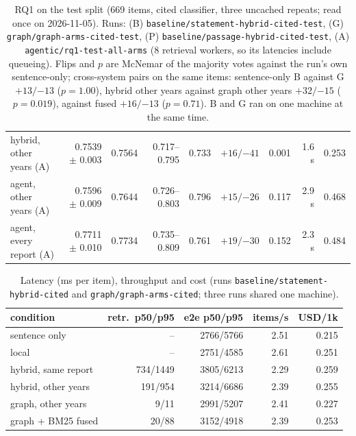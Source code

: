 \documentclass[11pt]{article}
\newcommand{\run}[1]{\nolinkurl{#1}}
\begin{document}
\begin{table}[!htbp]
\begin{tabular*}{\linewidth}{@{}@{\extracolsep{\fill}}lrrrrrrrr@{}}
hybrid, other years (A) & 0.7539 $\pm$ 0.003 & 0.7564 & 0.717--0.795 & 0.733 & $+16 / {-41}$ & 0.001 & 1.6 s & 0.253 \\
agent, other years (A) & 0.7596 $\pm$ 0.009 & 0.7644 & 0.726--0.803 & 0.796 & $+15 / {-26}$ & 0.117 & 2.9 s & 0.468 \\
agent, every report (A) & 0.7711 $\pm$ 0.010 & 0.7734 & 0.735--0.809 & 0.761 & $+19 / {-30}$ & 0.152 & 2.3 s & 0.484 \\
\bottomrule
\end{tabular*}
\caption{RQ1 on the test split (669 items, cited classifier, three uncached repeats; read once on 2026-11-05). Runs: (B) \run{baseline/statement-hybrid-cited-test}, (G) \run{graph/graph-arms-cited-test}, (P) \run{baseline/passage-hybrid-cited-test}, (A) \run{agentic/rq1-test-all-arms} (8 retrieval workers, so its latencies include queueing). Flips and $p$ are McNemar of the majority votes against the run's own sentence-only; cross-system pairs on the same items: sentence-only B against G $+13 / {-13}$ ($p = 1.00$), hybrid other years against graph other years $+32 / {-15}$ ($p = 0.019$), against fused $+16 / {-13}$ ($p = 0.71$). B and G ran on one machine at the same time.}
\label{tab:rq1-test}
\end{table}

\begin{table}[!htbp]
\centering\footnotesize
\setlength{\tabcolsep}{3pt}
\begin{tabular*}{\linewidth}{@{}@{\extracolsep{\fill}}lrrrr@{}}
\toprule
condition & retr.\ p50/p95 & e2e p50/p95 & items/s & USD/1k \\
\midrule
sentence only & -- & 2766/5766 & 2.51 & 0.215 \\
local & -- & 2751/4585 & 2.61 & 0.251 \\
hybrid, same report & 734/1449 & 3805/6213 & 2.29 & 0.259 \\
hybrid, other years & 191/954 & 3214/6686 & 2.39 & 0.255 \\
graph, other years & 9/11 & 2991/5207 & 2.41 & 0.227 \\
graph + BM25 fused & 20/88 & 3152/4918 & 2.39 & 0.253 \\
\bottomrule
\end{tabular*}
\caption{Latency (ms per item), throughput and cost (runs \run{baseline/statement-hybrid-cited} and \run{graph/graph-arms-cited}; three runs shared one machine).}
\label{tab:rq1-cost}
\end{table}

\FloatBarrier
\end{document}
